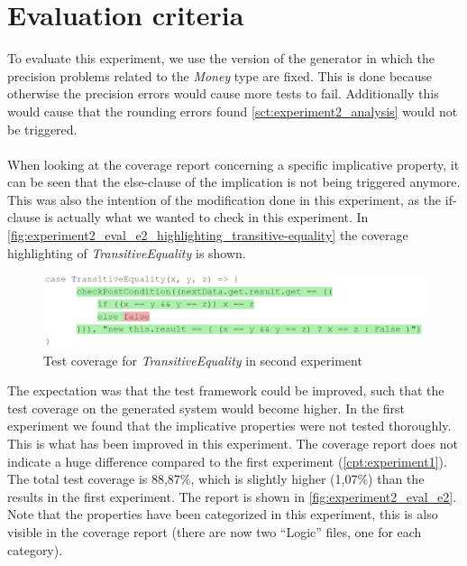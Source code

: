 \section{Evaluation criteria}
To evaluate this experiment, we use the version of the generator in which the precision problems related to the \textit{Money} type are fixed. This is done because otherwise the precision errors would cause more tests to fail. Additionally this would cause that the rounding errors found \autoref{sct:experiment2_analysis} would not be triggered.\\
\\
When looking at the coverage report concerning a specific implicative property,
it can be seen that the else-clause of the implication is not being triggered
anymore. This was also the intention of the modification done in this
experiment, as the if-clause is actually what we wanted to check in this
experiment. In
\autoref{fig:experiment2_eval_e2_highlighting_transitive-equality} the coverage
highlighting of \textit{TransitiveEquality} is shown.
\begin{figure}[!ht]
	\includegraphics[width=\linewidth]{figures/e2_coverage_implicative_property}
\caption{Test coverage for \textit{TransitiveEquality} in second experiment}
\label{fig:experiment2_eval_e2_highlighting_transitive-equality}
\centering
\end{figure}
\FloatBarrier\noindent
%
The expectation was that the test framework could be improved, such that the
test coverage on the generated system would become higher. In the first
experiment we found that the implicative properties were not tested thoroughly. This is what has been improved in this experiment. The coverage report does not indicate a huge difference compared to the first experiment (\autoref{cpt:experiment1}). The total test coverage is 88,87\%, which is slightly higher (1,07\%) than the results in the first experiment. The report is shown in \autoref{fig:experiment2_eval_e2}. Note that the properties have been categorized in this experiment, this is also visible in the coverage report (there are now two ``Logic'' files, one for each category).

